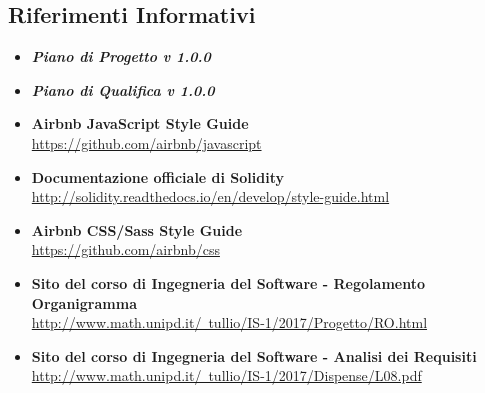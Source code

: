 \documentclass[NormeDiProgetto.tex]{subfiles}
\begin{document}
\subsection{Riferimenti Informativi}
\begin{itemize}
	\item \textbf{\textit{Piano di Progetto v 1.0.0}}
	\item \textbf{\textit{Piano di Qualifica v 1.0.0}}
	\item \textbf{Airbnb JavaScript Style Guide}\\
	\href{https://github.com/airbnb/javascript}{https://github.com/airbnb/javascript}
	\item \textbf{Documentazione officiale di Solidity}\\
	\href{http://solidity.readthedocs.io/en/develop/style-guide.html}{http://solidity.readthedocs.io/en/develop/style-guide.html}
	\item \textbf{Airbnb CSS/Sass Style Guide}\\
	\href{https://github.com/airbnb/css}{https://github.com/airbnb/css}
	\item \textbf{Sito del corso di Ingegneria del Software - Regolamento Organigramma}\\
	\href{http://www.math.unipd.it/~tullio/IS-1/2017/Progetto/RO.html}{http://www.math.unipd.it/~tullio/IS-1/2017/Progetto/RO.html}
	\item \textbf{Sito del corso di Ingegneria del Software - Analisi dei Requisiti}\\
	\href{http://www.math.unipd.it/~tullio/IS-1/2017/Dispense/L08.pdf}{http://www.math.unipd.it/~tullio/IS-1/2017/Dispense/L08.pdf}
\end{itemize}
\end{document}
